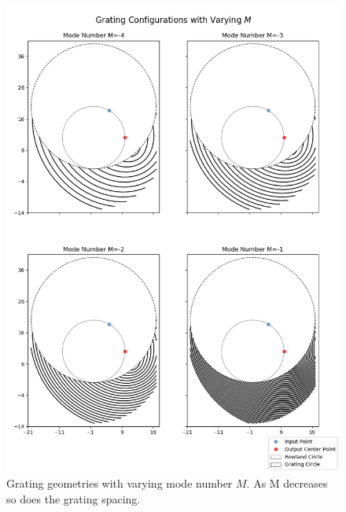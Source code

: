 \documentclass{article}
\begin{document}
    \begin{figure}[H]        
    \centering
    \scriptsize 
    \includegraphics[width=0.9 \textwidth]{images/varied_M_0.png}
    \caption{\label{fig:vary_M} Grating geometries with varying mode number $M$. As M decreases so does the grating spacing.}
    \end{figure}
    
\end{document}
